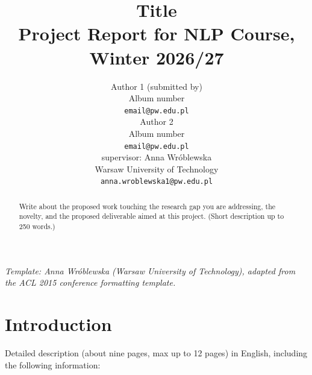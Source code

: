 \documentclass[11pt]{article}
\title{Title\\Project Report for NLP Course, Winter 2026/27}
\author{Author 1 (submitted by) \\
  Album number \\
  {\tt email@pw.edu.pl} \\
  \And
  Author 2 \\
  Album number \\
  {\tt email@pw.edu.pl} \\
  \AND
  supervisor: Anna Wróblewska\\
  Warsaw University of Technology \\
  {\tt anna.wroblewska1@pw.edu.pl}
  }
\date{}
\begin{document}
\maketitle

{\small\em Template: Anna Wr\'oblewska (Warsaw University of Technology), adapted from the ACL 2015 conference formatting template.}
\vspace{4pt}


\begin{abstract}
  Write about the proposed work touching the research gap you are addressing, the novelty, and the proposed deliverable aimed at this project.
  (Short description up to 250 words.)
\end{abstract}

\section{Introduction}
Detailed description (about nine pages, max up to 12 pages) in English, including the following information:
\end{document}
